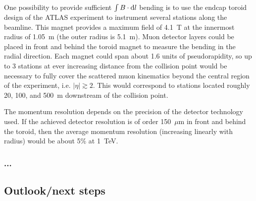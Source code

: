 One possibility to provide sufficient $\int B\cdot {\rm d}l$ bending is to use the endcap toroid design of the ATLAS experiment \cite{ATLAS:2008xda,ATLAS-Toroid} to instrument several stations along the beamline.
This magnet provides a maximum field of 4.1~T at the innermost radius of 1.05~m (the outer radius is 5.1~m).
Muon detector layers could be placed in front and behind the toroid magnet to measure the bending in the radial direction.
Each magnet could span about 1.6 units of pseudorapidity, so up to 3 stations at ever increasing distance from the collision point would be necessary to fully cover the scattered muon kinematics beyond the central region of the experiment, i.e. $|\eta| \gtrsim 2 $.
This would correspond to stations located roughly 20, 100, and 500~m downstream of the collision point. 

The momentum resolution depends on the precision of the detector technology used. If the achieved detector resolution is of order 150~$\mu$m in front and behind the toroid, then the average momentum resolution (increasing linearly with radius) would be about 5\% at 1~TeV. 

\subsubsection{...}

\subsection{Outlook/next steps}

